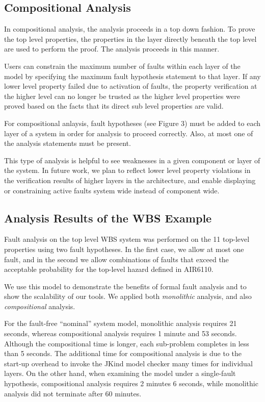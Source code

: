 \subsection{Compositional Analysis}
In compositional analysis, the analysis proceeds in a top down fashion. To prove the top level properties, the properties in the layer directly beneath the top level are used to perform the proof. The analysis proceeds in this manner.

 Users can constrain the maximum number of faults within each layer of the model by specifying the maximum fault hypothesis statement to that layer. If any lower level property failed due to activation of faults, the property verification at the higher level can no longer be trusted as the higher level properties were proved based on the facts that its direct sub level properties are valid.
 
For compositional anlaysis, fault hypotheses (see Figure 3) must be added to each layer of a system in order for analysis to proceed correctly. Also, at most one of the analysis statements must be present. 
 
 This type of analysis is helpful to see weaknesses in a given component or layer of the system. In future work, we plan to reflect lower level property violations in the verification results of higher layers in the architecture, and enable displaying or constraining active faults system wide instead of component wide.

\subsection{Analysis Results of the WBS Example}
\label{sec:results}

Fault analysis on the top level WBS system was performed on the 11 top-level properties using two fault hypotheses.  In the first case, we allow at most one fault, and in the second we allow combinations of faults that exceed the acceptable probability for the top-level hazard defined in AIR6110.

We use this model to demonstrate the benefits of formal fault analysis and to show the scalability of our tools.  We applied both {\em monolithic} analysis, and also {\em compositional} analysis.


For the fault-free ``nominal'' system model, monolithic analysis requires 21 seconds, whereas compositional analysis requires 1 minute and 53 seconds.  Although the compositional time is longer, each sub-problem completes in less than 5 seconds.  The additional time for compositional analysis is  due to the start-up overhead to invoke the JKind model checker many times for individual layers.  On the other hand, when examining the model under a single-fault hypothesis, compositional analysis requires 2 minutes 6 seconds, while monolithic analysis did not terminate after 60 minutes.

